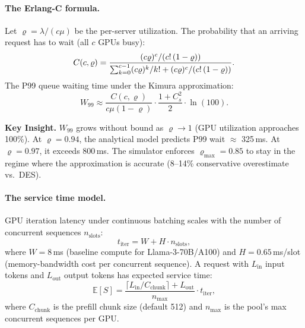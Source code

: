 \documentclass[11pt,a4paper]{article}
\newenvironment{keyinsight}
  {\begin{mdframed}[backgroundcolor=blue!5!white,linecolor=blue!60!black,linewidth=1pt]
   \textbf{Key Insight. }\ignorespaces}
  {\end{mdframed}}
\begin{document}
\paragraph{The Erlang-C formula.}
Let $\varrho = \lambda/(c\mu)$ be the per-server utilization.  The
probability that an arriving request has to wait (all $c$ GPUs busy):
\begin{equation}
  C(c, \varrho) = \frac{(c\varrho)^c / (c!\,(1-\varrho))}{%
    \sum_{k=0}^{c-1}(c\varrho)^k/k! + (c\varrho)^c/(c!\,(1-\varrho))}.
  \label{eq:erlang-c}
\end{equation}
The P99 queue waiting time under the Kimura approximation:
\begin{equation}
  W_{99} \approx \frac{C(c,\varrho)}{c\mu(1-\varrho)}
    \cdot \frac{1+C_s^2}{2} \cdot \ln(100).
  \label{eq:w99}
\end{equation}

\begin{keyinsight}
  $W_{99}$ grows without bound as $\varrho \to 1$ (GPU utilization
  approaches 100\%).  At $\varrho = 0.94$, the analytical model
  predicts P99 wait $\approx$ 325\,ms.  At $\varrho = 0.97$, it
  exceeds 800\,ms.  The simulator enforces $\varrho_{\max} = 0.85$
  to stay in the regime where the approximation is accurate
  (8--14\% conservative overestimate vs.\ DES).
\end{keyinsight}

\paragraph{The service time model.}
GPU iteration latency under continuous batching scales with the number
of concurrent sequences $n_{\text{slots}}$:
\begin{equation}
  t_{\text{iter}} = W + H \cdot n_{\text{slots}},
  \label{eq:iter}
\end{equation}
where $W = 8$\,ms (baseline compute for Llama-3-70B/A100) and
$H = 0.65$\,ms/slot (memory-bandwidth cost per concurrent sequence).
A request with $L_{\text{in}}$ input tokens and $L_{\text{out}}$
output tokens has expected service time:
\begin{equation}
  \mathbb{E}[S] = \frac{\lceil L_{\text{in}} / C_{\text{chunk}} \rceil
    + L_{\text{out}}}{n_{\max}} \cdot t_{\text{iter}},
  \label{eq:service-time}
\end{equation}
where $C_{\text{chunk}}$ is the prefill chunk size (default 512) and
$n_{\max}$ is the pool's max concurrent sequences per GPU.
\end{document}
